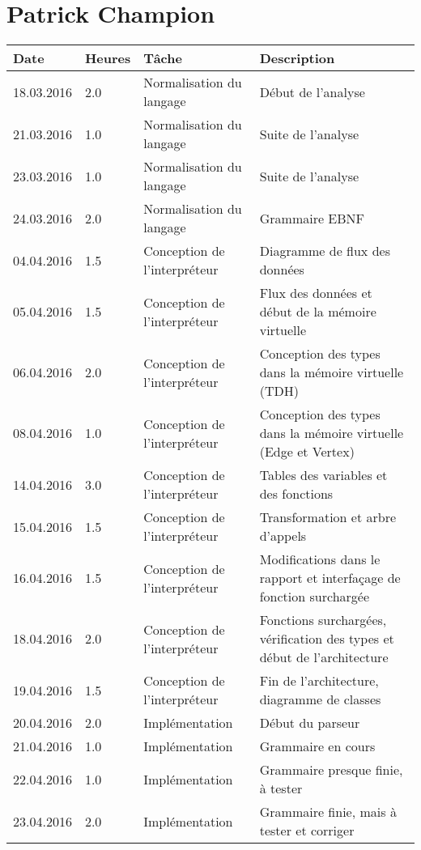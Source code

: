 \documentclass[french]{article}
\begin{document}
	\section*{Patrick Champion}
	\begin{tabular}{p{}|p{}|p{}|p{}}
		Date & Heures & Tâche & Description\\ 
		\hline \hline
		18.03.2016 & 2.0 & Normalisation du langage & Début de l'analyse\\ 
		\hline
		21.03.2016 & 1.0 & Normalisation du langage & Suite de l'analyse\\
		23.03.2016 & 1.0 & Normalisation du langage & Suite de l'analyse\\
		24.03.2016 & 2.0 & Normalisation du langage & Grammaire EBNF\\  
		\hline
		04.04.2016 & 1.5 & Conception de l'interpréteur & Diagramme de flux des données\\
		05.04.2016 & 1.5 & Conception de l'interpréteur & Flux des données et début de la mémoire virtuelle\\
		06.04.2016 & 2.0 & Conception de l'interpréteur & Conception des types dans la mémoire virtuelle (TDH)\\
		08.04.2016 & 1.0 & Conception de l'interpréteur & Conception des types dans la mémoire virtuelle (Edge et Vertex)\\ 
		\hline
		14.04.2016 & 3.0 & Conception de l'interpréteur & Tables des variables et des fonctions\\
		15.04.2016 & 1.5 & Conception de l'interpréteur & Transformation et arbre d'appels\\
		16.04.2016 & 1.5 & Conception de l'interpréteur & Modifications dans le rapport et interfaçage de fonction surchargée\\ 
		\hline
		18.04.2016 & 2.0 & Conception de l'interpréteur & Fonctions surchargées, vérification des types et début de l'architecture\\
		19.04.2016 & 1.5 & Conception de l'interpréteur & Fin de l'architecture, diagramme de classes\\ 
		20.04.2016 & 2.0 & Implémentation & Début du parseur\\
		21.04.2016 & 1.0 & Implémentation & Grammaire en cours\\
		22.04.2016 & 1.0 & Implémentation & Grammaire presque finie, à tester\\
		23.04.2016 & 2.0 & Implémentation & Grammaire finie, mais à tester et corriger\\

\end{tabular}
\end{document}
